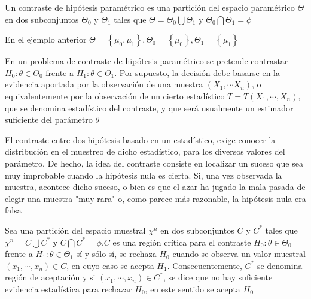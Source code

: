 \begin{definición} 
Un contraste de hipótesis paramétrico es una partición del espacio paramétrico $\Theta$ en dos subconjuntos $\Theta_{0}$ y $\Theta_{1}$ tales que $\Theta=\Theta_{0} \bigcup \Theta_{1}$ y $\Theta_{0} \bigcap \Theta_{1}=\phi$
\end{definición}

En el ejemplo anterior $\Theta=\left\{\mu_{0}, \mu_{1}\right\}, \Theta_{0}=\left\{\mu_{0}\right\}, \Theta_{1}=\left\{\mu_{1}\right\}$

En un problema de contraste de hipótesis paramétrico se pretende contrastar $H_{0}: \theta \in \Theta_{0}$ frente a $H_{1}: \theta \in \Theta_{1}$. Por supuesto, la decisión debe basarse en la evidencia aportada por la observación de una muestra $\left(X_{1}, \cdots X_{n}\right)$, o equivalentemente por la observación de un cierto estadístico $T=T\left(X_{1}, \cdots, X_{n}\right)$, que se denomina estadístico del contraste, y que será usualmente un estimador suficiente del parámetro $\theta$

El contraste entre dos hipótesis basado en un estadístico, exige conocer la distribución en el muestreo de dicho estadístico, para los diversos valores del parámetro. De hecho, la idea del contraste consiste en localizar un suceso que sea muy improbable cuando la hipótesis nula es cierta. Si, una vez observada la muestra, acontece dicho suceso, o bien es que el azar ha jugado la mala pasada de elegir una muestra "muy rara" o, como parece más razonable, la hipótesis nula era falsa

\begin{definición} 
Sea una partición del espacio muestral $\chi^{n}$ en dos subconjuntos $C$ y $C^{*}$ tales que $\chi^{n}=C \bigcup C^{*}$ y $C \bigcap C^{*}=\phi . C$ es una región crítica para el contraste $H_{0}: \theta \in \Theta_{0}$ frente a $H_{1}: \theta \in \Theta_{1}$ sí y sólo sí, se rechaza $H_{0}$ cuando se observa un valor muestral $\left(x_{1}, \cdots, x_{n}\right) \in C$, en cuyo caso se acepta $H_{1}$. Consecuentemente, $C^{*}$ se denomina región de aceptación y si $\left(x_{1}, \cdots, x_{n}\right) \in C^{*}$, se dice que no hay suficiente evidencia estadística para rechazar $H_{0}$, en este sentido se acepta $H_{0}$
\end{definición}


